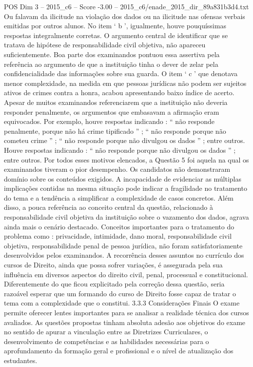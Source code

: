 \begin{textsample}{POS Dim 3 – 2015\_c6 – Score -3.00 – 2015\_c6/enade\_2015\_dir\_89a831b3d4.txt}
Ou falavam da ilicitude na violação dos dados ou na ilicitude nas ofensas verbais emitidas por outros alunos.
No item ‘ b ’, igualmente, houve pouquíssimas respostas integralmente corretas.
O argumento central de identificar que se tratava de hipótese de responsabilidade civil objetiva, não apareceu suficientemente.
Boa parte dos examinandos pontuou essa assertiva pela referência ao argumento de que a instituição tinha o dever de zelar pela confidencialidade das informações sobre sua guarda.
O item ‘ c ’ que denotava menor complexidade, na medida em que pessoas jurídicas não podem ser sujeitos ativos de crimes contra a honra, acabou apresentando baixo índice de acerto.
Apesar de muitos examinandos referenciarem que a instituição não deveria responder penalmente, os argumentos que embasavam a afirmação eram equivocados.
Por exemplo, houve respostas indicando : “ não responde penalmente, porque não há crime tipificado ” ; “ não responde porque não cometeu crime ” ; “ não responde porque não divulgou os dados ” ; entre outros.
Houve respostas indicando : “ não responde porque não divulgou os dados ” ; entre outros.
Por todos esses motivos elencados, a Questão 5 foi aquela na qual os examinandos tiveram o pior desempenho.
Os candidatos não demonstraram domínio sobre os conteúdos exigidos.
A incapacidade de evidenciar as múltiplas implicações contidas na mesma situação pode indicar a fragilidade no tratamento do tema e a tendência a simplificar a complexidade de casos concretos.
Além disso, a pouca referência ao conceito central da questão, relacionado à responsabilidade civil objetiva da instituição sobre o vazamento dos dados, agrava ainda mais o cenário destacado.
Conceitos importantes para o tratamento do problema como : privacidade, intimidade, dano moral, responsabilidade civil objetiva, responsabilidade penal de pessoa jurídica, não foram satisfatoriamente desenvolvidos pelos examinandos.
A recorrência desses assuntos no currículo dos cursos de Direito, ainda que possa sofrer variações, é assegurada pela sua influência em diversos aspectos do direito civil, penal, processual e constitucional.
Diferentemente do que ficou explicitado pela correção dessa questão, seria razoável esperar que um formando do curso de Direito fosse capaz de tratar o tema com a complexidade que o constitui. 3.3.3 Considerações Finais O exame permite oferecer lentes importantes para se analisar a realidade técnica dos cursos avaliados.
As questões propostas tinham absoluta adesão aos objetivos do exame no sentido de apurar a vinculação entre as Diretrizes Curriculares, o desenvolvimento de competências e as habilidades necessárias para o aprofundamento da formação geral e profissional e o nível de atualização dos estudantes.

\end{textsample}
